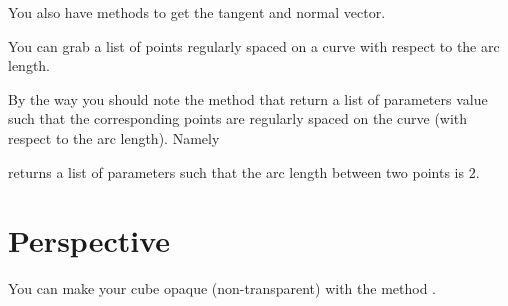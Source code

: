 \begin{center}
   
\end{center}

You also have methods to get the tangent and normal vector. 




\begin{center}
   
\end{center}


You can grab a list of points regularly spaced on a curve with respect to the arc length.



\begin{center}
   
\end{center}

By the way you should note the method  that return a list of parameters value such that the corresponding points are regularly spaced on the curve (with respect to the arc length). Namely



returns a list of parameters such that the arc length between two points is \( 2\).


\section{Perspective}

You can make your cube opaque (non-transparent) with the method .


\begin{example}
    


    \begin{center}
        
    \end{center}
\end{example}

